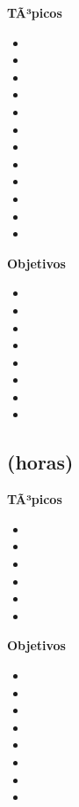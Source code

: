 \textbf{TÃ³picos}
\begin{itemize}
	\item \PFTRESTopicTipos
	\item \PFTRESTopicArreglos
	\item \PFTRESTopicRegistros
	\item \PFTRESTopicCadenas
	\item \PFTRESTopicRepresentacion
	\item \PFTRESTopicAsignacion
	\item \PFTRESTopicAdministracion
	\item \PFTRESTopicPunteros
	\item \PFTRESTopicEstructuras
	\item \PFTRESTopicEstrategias
	\item \PFTRESTopicEstrategiasde
	\item \PFTRESTopicEstrategiaspara
\end{itemize}

\textbf{Objetivos}
\begin{itemize}
	\item \PFTRESObjUNO
	\item \PFTRESObjDOS
	\item \PFTRESObjTRES
	\item \PFTRESObjCUATRO
	\item \PFTRESObjCINCO
	\item \PFTRESObjSEIS
	\item \PFTRESObjSIETE
	\item \PFTRESObjOCHO
\end{itemize}

\subsection{\PFCUATRODef  (\PFCUATROHours horas)}\label{sec:BOK-PF4}

\textbf{TÃ³picos}
\begin{itemize}
	\item \PFCUATROTopicEl
	\item \PFCUATROTopicFunciones
	\item \PFCUATROTopicProcedimientos
	\item \PFCUATROTopicEstrategias
	\item \PFCUATROTopicBacktracking
	\item \PFCUATROTopicImplementacion
\end{itemize}

\textbf{Objetivos}
\begin{itemize}
	\item \PFCUATROObjUNO
	\item \PFCUATROObjDOS
	\item \PFCUATROObjTRES
	\item \PFCUATROObjCUATRO
	\item \PFCUATROObjCINCO
	\item \PFCUATROObjSEIS
	\item \PFCUATROObjSIETE
	\item \PFCUATROObjOCHO
\end{itemize}

